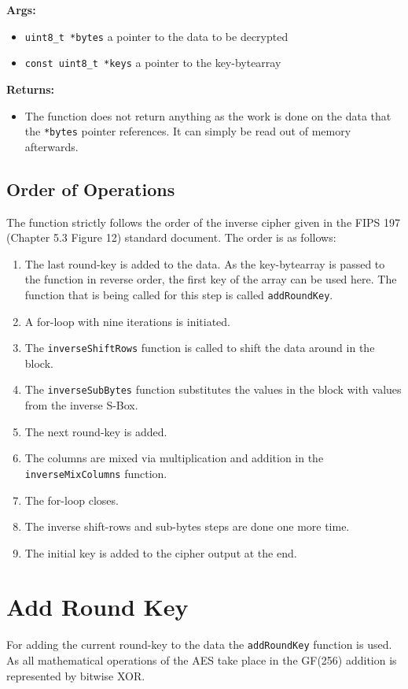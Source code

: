 \textbf{Args:}
\begin{itemize}
  \item \lstinline{uint8_t *bytes} a pointer to the data to be decrypted
  \item \lstinline{const uint8_t *keys} a pointer to the key-bytearray
\end{itemize}

\textbf{Returns:}
\begin{itemize}
  \item The function does not return anything as the work is done on the data that the \lstinline{*bytes} pointer references. It can simply be read out of memory afterwards.
\end{itemize}

\subsection{Order of Operations}
The function strictly follows the order of the inverse cipher given in the FIPS 197 (Chapter 5.3 Figure 12) standard document. The order is as follows:
\begin{enumerate}
  \item The last round-key is added to the data. As the key-bytearray is passed to the function in reverse order, the first key of the array can be used here. The function that is being called for this step is called \lstinline{addRoundKey}.
  \item A for-loop with nine iterations is initiated.
  \item The \lstinline{inverseShiftRows} function is called to shift the data around in the block.
  \item The \lstinline{inverseSubBytes} function substitutes the values in the block with values from the inverse S-Box.
  \item The next round-key is added.
  \item The columns are mixed via multiplication and addition in the \lstinline{inverseMixColumns} function.
  \item The for-loop closes.
  \item The inverse shift-rows and sub-bytes steps are done one more time.
  \item The initial key is added to the cipher output at the end.
\end{enumerate}


\section{Add Round Key}
\label{ch:dec_addroundkey}
For adding the current round-key to the data the \lstinline{addRoundKey} function is used. As all mathematical operations of the AES take place in the GF(256) addition is represented by bitwise XOR.


